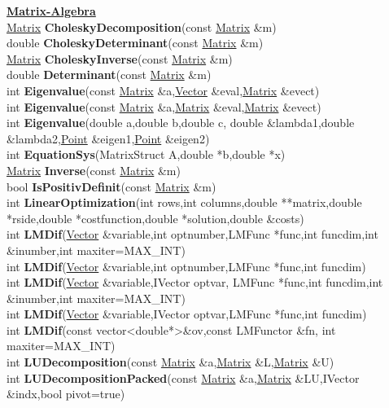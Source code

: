 \documentclass[10pt,titlepage]{article}
\newcommand{\subtitle}[1]{{\noindent\bf#1}}
\def\functionlistentry#1#2#3#4#5#6{\noindent #1 {\bf #2}(#3) \dotfill #6\\}
\begin{document}
{{\subtitle{\hyperlink{SECTION:matrixAlgebra}{Matrix-Algebra}}\\
\functionlistentry{\hyperlink{Matrix}{Matrix}}{CholeskyDecomposition}{const \hyperlink{Matrix}{Matrix} \&m}{1116}{matrixAlgebra}{}
\functionlistentry{double}{CholeskyDeterminant}{const \hyperlink{Matrix}{Matrix} \&m}{1119}{matrixAlgebra}{}
\functionlistentry{\hyperlink{Matrix}{Matrix}}{CholeskyInverse}{const \hyperlink{Matrix}{Matrix} \&m}{1115}{matrixAlgebra}{}
\functionlistentry{double}{Determinant}{const \hyperlink{Matrix}{Matrix} \&m}{1118}{matrixAlgebra}{}
\functionlistentry{int}{Eigenvalue}{const \hyperlink{Matrix}{Matrix} \&a,\hyperlink{Vector}{Vector} \&eval,\hyperlink{Matrix}{Matrix} \&evect}{1128}{matrixAlgebra}{}
\functionlistentry{int}{Eigenvalue}{const \hyperlink{Matrix}{Matrix} \&a,\hyperlink{Matrix}{Matrix} \&eval,\hyperlink{Matrix}{Matrix} \&evect}{1129}{matrixAlgebra}{}
\functionlistentry{int}{Eigenvalue}{double a,double b,double c, double \&lambda1,double \&lambda2,\hyperlink{Point}{Point} \&eigen1,\hyperlink{Point}{Point} \&eigen2}{1130}{matrixAlgebra}{}
\functionlistentry{int}{EquationSys}{MatrixStruct A,double *b,double *x}{1125}{matrixAlgebra}{}
\functionlistentry{\hyperlink{Matrix}{Matrix}}{Inverse}{const \hyperlink{Matrix}{Matrix} \&m}{1114}{matrixAlgebra}{}
\functionlistentry{bool}{IsPositivDefinit}{const \hyperlink{Matrix}{Matrix} \&m}{1117}{matrixAlgebra}{}
\functionlistentry{int}{LinearOptimization}{int rows,int columns,double **matrix,double *rside,double *costfunction,double *solution,double \&costs}{1136}{matrixAlgebra}{}
\functionlistentry{int}{LMDif}{\hyperlink{Vector}{Vector} \&variable,int optnumber,LMFunc *func,int funcdim,int \&inumber,int maxiter=MAX\_INT}{1137}{matrixAlgebra}{}
\functionlistentry{int}{LMDif}{\hyperlink{Vector}{Vector} \&variable,int optnumber,LMFunc *func,int funcdim}{1138}{matrixAlgebra}{}
\functionlistentry{int}{LMDif}{\hyperlink{Vector}{Vector} \&variable,IVector optvar, LMFunc *func,int funcdim,int \&inumber,int maxiter=MAX\_INT}{1139}{matrixAlgebra}{}
\functionlistentry{int}{LMDif}{\hyperlink{Vector}{Vector} \&variable,IVector optvar,LMFunc *func,int funcdim}{1140}{matrixAlgebra}{}
\functionlistentry{int}{LMDif}{const vector\textless {}double*\textgreater  \&ov,const LMFunctor \&fn, int maxiter=MAX\_INT}{1141}{matrixAlgebra}{}
\functionlistentry{int}{LUDecomposition}{const \hyperlink{Matrix}{Matrix} \&a,\hyperlink{Matrix}{Matrix} \&L,\hyperlink{Matrix}{Matrix} \&U}{1121}{matrixAlgebra}{}
\functionlistentry{int}{LUDecompositionPacked}{const \hyperlink{Matrix}{Matrix} \&a,\hyperlink{Matrix}{Matrix} \&LU,IVector \&indx,bool pivot=true}{1122}{matrixAlgebra}{}
}}
\end{document}
